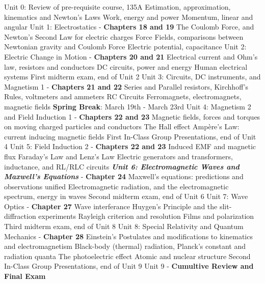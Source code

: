 \documentclass[10pt]{article}
\begin{document}
\begin{outline}[enumerate]
\1 Unit 0: Review of pre-requisite course, 135A
\2 Estimation, approximation, kinematics and Newton's Laws
\2 Work, energy and power
\2 Momentum, linear and angular
\1 Unit 1: Electrostatics - \textbf{Chapters 18 and 19}
\2 The Coulomb Force, and Newton's Second Law for electric charges
\2 Force Fields, comparisons between Newtonian gravity and Coulomb Force
\2 Electric potential, capacitance
\1 Unit 2: Electric Change in Motion - \textbf{Chapters 20 and 21}
\2 Electrical current and Ohm's law, resistors and conductors
\2 DC circuits, power and energy
\2 Human electrical systems
\1 First midterm exam, end of Unit 2
\1 Unit 3: Circuits, DC instruments, and Magnetism 1 - \textbf{Chapters 21 and 22}
\2 Series and Parallel resistors, Kirchhoff's Rules, voltmeters and ammeters
\2 RC Circuits
\2 Ferromagnets, electromagnets, magnetic fields
\1 \textbf{Spring Break}: March 19th - March 23rd
\1 Unit 4: Magnetism 2 and Field Induction 1 - \textbf{Chapters 22 and 23}
\2 Magnetic fields, forces and torques on moving charged particles and conductors
\2 The Hall effect
\2 Amp\`{e}re's Law: current inducing magnetic fields
\1 First In-Class Group Presentations, end of Unit 4
\1 Unit 5: Field Induction 2 - \textbf{Chapters 22 and 23}
\2 Induced EMF and magnetic flux
\2 Faraday's Law and Lenz's Law
\2 Electric generators and transformers, inductance, and RL/RLC circuits
\1 \textit{\textbf{ Unit 6: Electromagnetic Waves and Maxwell's Equations}} - \textbf{Chapter 24}
\2 Maxwell's equations: predictions and observations unified
\2 Electromagnetic radiation, and the electromagnetic spectrum, energy in waves
\1 Second midterm exam, end of Unit 6
\1 Unit 7: Wave Optics - \textbf{Chapter 27}
\2 Wave interferance
\2 Huygen's Principle and the slit-diffraction experiments
\2 Rayleigh criterion and resolution
\2 Films and polarization
\1 Third midterm exam, end of Unit 8
\1 Unit 8: Special Relativity and Quantum Mechanics - \textbf{Chapter 28}
\2 Einstein's Postulates and modifications to kinematics and electromagnetism
\2 Black-body (thermal) radiation, Planck's constant and radiation quanta
\2 The photoelectric effect
\2 Atomic and nuclear structure
\1 Second In-Class Group Presentations, end of Unit 9
\1 Unit 9 - \textbf{Cumultive Review and Final Exam}
\end{outline}
\end{document}
